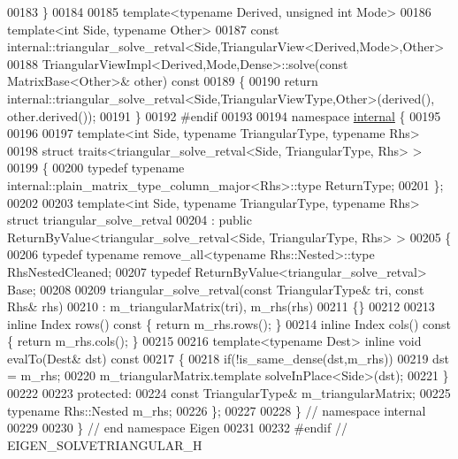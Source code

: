 \begin{DoxyCode}
00183 \}
00184 
00185 \textcolor{keyword}{template}<\textcolor{keyword}{typename} Derived, \textcolor{keywordtype}{unsigned} \textcolor{keywordtype}{int} Mode>
00186 \textcolor{keyword}{template}<\textcolor{keywordtype}{int} S\textcolor{keywordtype}{id}e, \textcolor{keyword}{typename} Other>
00187 \textcolor{keyword}{const} internal::triangular\_solve\_retval<Side,TriangularView<Derived,Mode>,Other>
00188 TriangularViewImpl<Derived,Mode,Dense>::solve(\textcolor{keyword}{const} MatrixBase<Other>& other)\textcolor{keyword}{ const}
00189 \textcolor{keyword}{}\{
00190   \textcolor{keywordflow}{return} internal::triangular\_solve\_retval<Side,TriangularViewType,Other>(derived(), other.derived());
00191 \}
00192 \textcolor{preprocessor}{#endif}
00193 
00194 \textcolor{keyword}{namespace }\hyperlink{namespaceinternal}{internal} \{
00195 
00196 
00197 \textcolor{keyword}{template}<\textcolor{keywordtype}{int} S\textcolor{keywordtype}{id}e, \textcolor{keyword}{typename} TriangularType, \textcolor{keyword}{typename} Rhs>
00198 \textcolor{keyword}{struct }traits<triangular\_solve\_retval<Side, TriangularType, Rhs> >
00199 \{
00200   \textcolor{keyword}{typedef} \textcolor{keyword}{typename} internal::plain\_matrix\_type\_column\_major<Rhs>::type ReturnType;
00201 \};
00202 
00203 \textcolor{keyword}{template}<\textcolor{keywordtype}{int} S\textcolor{keywordtype}{id}e, \textcolor{keyword}{typename} TriangularType, \textcolor{keyword}{typename} Rhs> \textcolor{keyword}{struct }triangular\_solve\_retval
00204  : \textcolor{keyword}{public} ReturnByValue<triangular\_solve\_retval<Side, TriangularType, Rhs> >
00205 \{
00206   \textcolor{keyword}{typedef} \textcolor{keyword}{typename} remove\_all<typename Rhs::Nested>::type RhsNestedCleaned;
00207   \textcolor{keyword}{typedef} ReturnByValue<triangular\_solve\_retval> Base;
00208 
00209   triangular\_solve\_retval(\textcolor{keyword}{const} TriangularType& tri, \textcolor{keyword}{const} Rhs& rhs)
00210     : m\_triangularMatrix(tri), m\_rhs(rhs)
00211   \{\}
00212 
00213   \textcolor{keyword}{inline} Index rows()\textcolor{keyword}{ const }\{ \textcolor{keywordflow}{return} m\_rhs.rows(); \}
00214   \textcolor{keyword}{inline} Index cols()\textcolor{keyword}{ const }\{ \textcolor{keywordflow}{return} m\_rhs.cols(); \}
00215 
00216   \textcolor{keyword}{template}<\textcolor{keyword}{typename} Dest> \textcolor{keyword}{inline} \textcolor{keywordtype}{void} evalTo(Dest& dst)\textcolor{keyword}{ const}
00217 \textcolor{keyword}{  }\{
00218     \textcolor{keywordflow}{if}(!is\_same\_dense(dst,m\_rhs))
00219       dst = m\_rhs;
00220     m\_triangularMatrix.template solveInPlace<Side>(dst);
00221   \}
00222 
00223   \textcolor{keyword}{protected}:
00224     \textcolor{keyword}{const} TriangularType& m\_triangularMatrix;
00225     \textcolor{keyword}{typename} Rhs::Nested m\_rhs;
00226 \};
00227 
00228 \} \textcolor{comment}{// namespace internal}
00229 
00230 \} \textcolor{comment}{// end namespace Eigen}
00231 
00232 \textcolor{preprocessor}{#endif // EIGEN\_SOLVETRIANGULAR\_H}
\end{DoxyCode}
